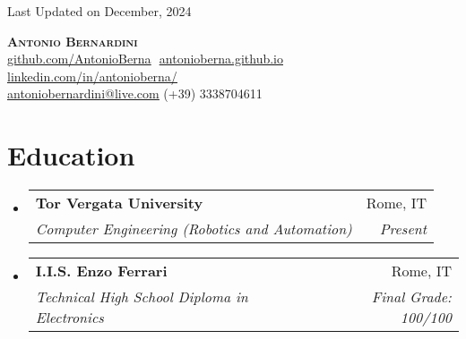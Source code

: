 \documentclass[letterpaper,11pt]{article}
\makeatletter
\newcommand{\resumeSubheading}[4]{
  \vspace{-2pt}\item
    \begin{tabular*}{0.97\textwidth}[t]{l@{\extracolsep{\fill}}r}
      \textbf{#1} & #2 \\
      \textit{\small#3} & \textit{\small #4} \\
    \end{tabular*}\vspace{-7pt}
}
\newcommand{\resumeProjectHeading}[2]{
    \item
    \begin{tabular*}{0.97\textwidth}{l@{\extracolsep{\fill}}r}
      \small#1 & #2 \\
    \end{tabular*}\vspace{-7pt}
}
\newcommand{\resumeSubHeadingListStart}{\begin{itemize}[leftmargin=0.15in, label={}]}
\newcommand{\resumeSubHeadingListEnd}{\end{itemize}}
\makeatother
\begin{document}
\begin{flushright}
  \color{gray}
  \item
  Last Updated on December, 2024
\end{flushright}

\vspace{-5pt}

\begin{center}
    \textbf{\Huge \scshape Antonio Bernardini} \\ \vspace{8pt}
    \small
    \href{https://github.com/AntonioBerna}{\underline{github.com/AntonioBerna}} $  $
    \href{https://antonioberna.github.io}
    {\underline{antonioberna.github.io}} $  $
    \href{https://www.linkedin.com/in/antonioberna/}{\underline{linkedin.com/in/antonioberna/}} $  $ \\
    \href{mailto:antoniobernardini@live.com}
    {\underline{antoniobernardini@live.com}}
     (+39) 3338704611
\end{center}

\section{Education}
  \resumeSubHeadingListStart
  
    \resumeSubheading
      {Tor Vergata University}{Rome, IT}
      {Computer Engineering (Robotics and Automation)}{Present}
    \resumeSubheading
      {I.I.S. Enzo Ferrari}{Rome, IT}
      {Technical High School Diploma in Electronics}{Final Grade: 100/100}      
  \resumeSubHeadingListEnd


\end{document}
